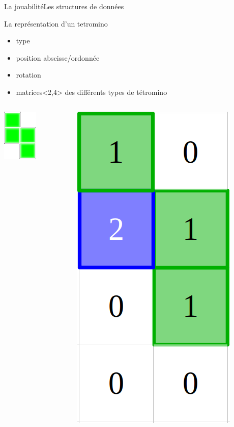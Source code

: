 \documentclass[french]{beamer}
\begin{document}
			\begin{frame}{La jouabilité}{Les structures de données}	

				\begin{block}{La représentation d'un tetromino}
					\begin{itemize}
						\item type
						\item position abscisse/ordonnée
						\item rotation
						\item matrices<2,4> des différents types de tétromino
					\end{itemize}
				\end{block}

				\begin{columns}
					\begin{column}{0.1\textwidth}
						\begin{center}
							\includegraphics[scale=0.5]{img/2.png}
						\end{center}
					\end{column}
					\begin{column}{0.1\textwidth}
						\begin{center}
							\includegraphics[scale=0.1]{img/tetro.png}
						\end{center}
					\end{column}
				\end{columns}
				
			\end{frame}
\end{document}
